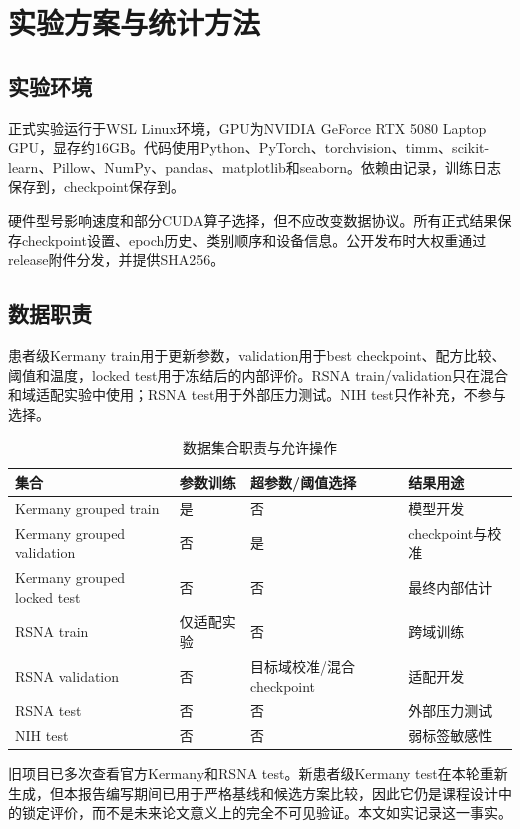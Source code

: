 \section{实验方案与统计方法}

\subsection{实验环境}

正式实验运行于WSL Linux环境，GPU为NVIDIA GeForce RTX 5080 Laptop GPU，显存约16GB。代码使用Python、PyTorch、torchvision、timm、scikit-learn、Pillow、NumPy、pandas、matplotlib和seaborn。依赖由记录，训练日志保存到，checkpoint保存到。

硬件型号影响速度和部分CUDA算子选择，但不应改变数据协议。所有正式结果保存checkpoint设置、epoch历史、类别顺序和设备信息。公开发布时大权重通过release附件分发，并提供SHA256。

\subsection{数据职责}

患者级Kermany train用于更新参数，validation用于best checkpoint、配方比较、阈值和温度，locked test用于冻结后的内部评价。RSNA train/validation只在混合和域适配实验中使用；RSNA test用于外部压力测试。NIH test只作补充，不参与选择。

\begin{table}[H]
\centering
\caption{数据集合职责与允许操作}
\begin{tabularx}{\textwidth}{lXXX}
\toprule 集合 & 参数训练 & 超参数/阈值选择 & 结果用途\\\midrule
Kermany grouped train & 是 & 否 & 模型开发\\
Kermany grouped validation & 否 & 是 & checkpoint与校准\\
Kermany grouped locked test & 否 & 否 & 最终内部估计\\
RSNA train & 仅适配实验 & 否 & 跨域训练\\
RSNA validation & 否 & 目标域校准/混合checkpoint & 适配开发\\
RSNA test & 否 & 否 & 外部压力测试\\
NIH test & 否 & 否 & 弱标签敏感性\\\bottomrule
\end{tabularx}
\end{table}

旧项目已多次查看官方Kermany和RSNA test。新患者级Kermany test在本轮重新生成，但本报告编写期间已用于严格基线和候选方案比较，因此它仍是课程设计中的锁定评价，而不是未来论文意义上的完全不可见验证。本文如实记录这一事实。

